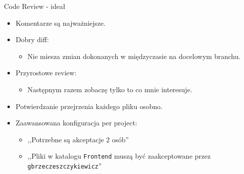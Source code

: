\documentclass[ignorenonframetext]{beamer}
\begin{document}
\begin{frame}{Code Review - ideał}
\begin{itemize}
	\item Komentarze są najważniejsze.
	\item Dobry diff:
	\begin{itemize} 
		\item Nie miesza zmian dokonanych w międzyczasie na docelowym branchu.
	\end{itemize}
	\item Przyrostowe review:
	\begin{itemize} 
		\item Następnym razem zobaczę tylko to co mnie interesuje.
	\end{itemize}
	\item Potwierdzanie przejrzenia każdego pliku osobno.
	\item Zaawansowana konfiguracja per project:
	\begin{itemize}
		\item ,,Potrzebne są akceptacje 2 osób''
		\item ,,Pliki w katalogu \texttt{Frontend} muszą być zaakceptowane przez \texttt{gbrzeczeszczykiewicz}''
	\end{itemize}
\end{itemize}
\end{frame}
\end{document}
